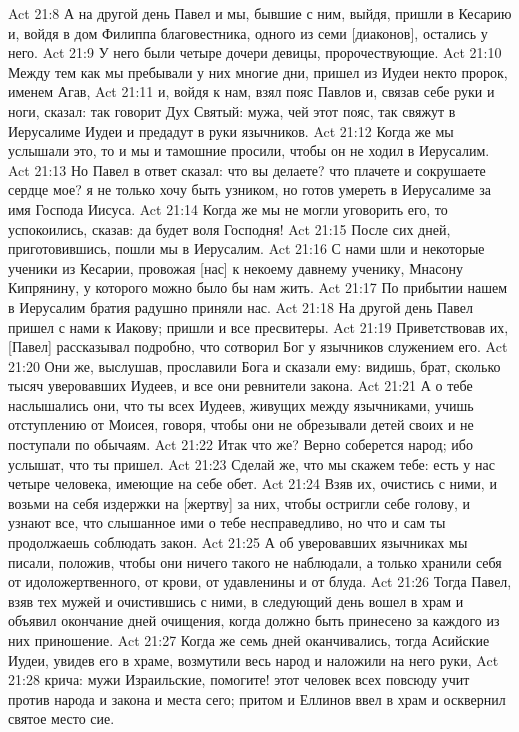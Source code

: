 Act 21:8  А на другой день Павел и мы, бывшие с ним, выйдя, пришли в Кесарию и, войдя в дом Филиппа благовестника, одного из семи [диаконов], остались у него.
Act 21:9  У него были четыре дочери девицы, пророчествующие.
Act 21:10  Между тем как мы пребывали у них многие дни, пришел из Иудеи некто пророк, именем Агав,
Act 21:11  и, войдя к нам, взял пояс Павлов и, связав себе руки и ноги, сказал: так говорит Дух Святый: мужа, чей этот пояс, так свяжут в Иерусалиме Иудеи и предадут в руки язычников.
Act 21:12  Когда же мы услышали это, то и мы и тамошние просили, чтобы он не ходил в Иерусалим.
Act 21:13  Но Павел в ответ сказал: что вы делаете? что плачете и сокрушаете сердце мое? я не только хочу быть узником, но готов умереть в Иерусалиме за имя Господа Иисуса.
Act 21:14  Когда же мы не могли уговорить его, то успокоились, сказав: да будет воля Господня!
Act 21:15  После сих дней, приготовившись, пошли мы в Иерусалим.
Act 21:16  С нами шли и некоторые ученики из Кесарии, провожая [нас] к некоему давнему ученику, Мнасону Кипрянину, у которого можно было бы нам жить.
Act 21:17  По прибытии нашем в Иерусалим братия радушно приняли нас.
Act 21:18  На другой день Павел пришел с нами к Иакову; пришли и все пресвитеры.
Act 21:19  Приветствовав их, [Павел] рассказывал подробно, что сотворил Бог у язычников служением его.
Act 21:20  Они же, выслушав, прославили Бога и сказали ему: видишь, брат, сколько тысяч уверовавших Иудеев, и все они ревнители закона.
Act 21:21  А о тебе наслышались они, что ты всех Иудеев, живущих между язычниками, учишь отступлению от Моисея, говоря, чтобы они не обрезывали детей своих и не поступали по обычаям.
Act 21:22  Итак что же? Верно соберется народ; ибо услышат, что ты пришел.
Act 21:23  Сделай же, что мы скажем тебе: есть у нас четыре человека, имеющие на себе обет.
Act 21:24  Взяв их, очистись с ними, и возьми на себя издержки на [жертву] за них, чтобы остригли себе голову, и узнают все, что слышанное ими о тебе несправедливо, но что и сам ты продолжаешь соблюдать закон.
Act 21:25  А об уверовавших язычниках мы писали, положив, чтобы они ничего такого не наблюдали, а только хранили себя от идоложертвенного, от крови, от удавленины и от блуда.
Act 21:26  Тогда Павел, взяв тех мужей и очистившись с ними, в следующий день вошел в храм и объявил окончание дней очищения, когда должно быть принесено за каждого из них приношение.
Act 21:27  Когда же семь дней оканчивались, тогда Асийские Иудеи, увидев его в храме, возмутили весь народ и наложили на него руки,
Act 21:28  крича: мужи Израильские, помогите! этот человек всех повсюду учит против народа и закона и места сего; притом и Еллинов ввел в храм и осквернил святое место сие.
